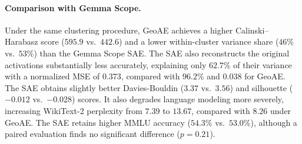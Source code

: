 \documentclass[11pt]{article}
\begin{document}
\paragraph{Comparison with Gemma Scope.} Under the same clustering procedure, GeoAE achieves a higher Calinski--Harabasz score ($595.9$ vs.\ $442.6$) and a lower within-cluster variance share ($46\%$ vs.\ $53\%$) than the Gemma Scope SAE. The SAE also reconstructs the original activations substantially less accurately, explaining only $62.7\%$ of their variance with a normalized MSE of $0.373$, compared with $96.2\%$ and $0.038$ for GeoAE. The SAE obtains slightly better Davies-Bouldin ($3.37$ vs.\ $3.56$) and silhouette ($-0.012$ vs.\ $-0.028$) scores. It also degrades language modeling more severely, increasing WikiText-2 perplexity from $7.39$ to $13.67$, compared with $8.26$ under GeoAE. The SAE retains higher MMLU accuracy ($54.3\%$ vs.\ $53.0\%$), although a paired evaluation finds no significant difference ($p=0.21$).



\end{document}

